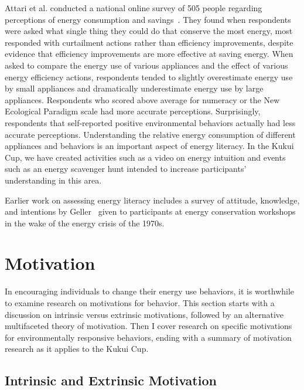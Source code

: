 Attari et al. conducted a national online survey of 505 people regarding perceptions of energy consumption and savings~\cite{Attari2010}. They found when respondents were asked what single thing they could do that conserve the most energy, most responded with curtailment actions rather than efficiency improvements, despite evidence that efficiency improvements are more effective at saving energy. When asked to compare the energy use of various appliances and the effect of various energy efficiency actions, respondents tended to slightly overestimate energy use by small appliances and dramatically underestimate energy use by large appliances. Respondents who scored above average for numeracy or the New Ecological Paradigm scale had more accurate perceptions. Surprisingly, respondents that self-reported positive environmental behaviors actually had less accurate perceptions. Understanding the relative energy consumption of different appliances and behaviors is an important aspect of energy literacy. In the Kukui Cup, we have created activities such as a video on energy intuition and events such as an energy scavenger hunt intended to increase participants' understanding in this area.

Earlier work on assessing energy literacy includes a survey of attitude, knowledge, and intentions by Geller~\cite{Geller81} given to participants at energy conservation workshops in the wake of the energy crisis of the 1970s.


\section{Motivation}

In encouraging individuals to change their energy use behaviors, it is worthwhile to examine research on motivations for behavior. This section starts with a discussion on intrinsic versus extrinsic motivations, followed by an alternative multifaceted theory of motivation. Then I cover research on specific motivations for environmentally responsive behaviors, ending with a summary of motivation research as it applies to the Kukui Cup.


\subsection{Intrinsic and Extrinsic Motivation}

